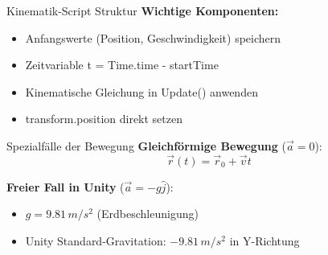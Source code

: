 \begin{concept}{Kinematik-Script Struktur}
    \textbf{Wichtige Komponenten:}
    \begin{itemize}
        \item Anfangswerte (Position, Geschwindigkeit) speichern
        \item Zeitvariable t = Time.time - startTime
        \item Kinematische Gleichung in Update() anwenden
        \item transform.position direkt setzen
    \end{itemize}
\end{concept}

\begin{concept}{Spezialfälle der Bewegung}
    \textbf{Gleichförmige Bewegung} ($\vec{a} = 0$):
    $$\vec{r}(t) = \vec{r}_0 + \vec{v}t$$
    
    \textbf{Freier Fall in Unity} ($\vec{a} = -g\hat{j}$):
    \begin{itemize}
        \item $g = 9.81 \, m/s^2$ (Erdbeschleunigung)
        \item Unity Standard-Gravitation: $-9.81 \, m/s^2$ in Y-Richtung
    \end{itemize}
\end{concept}

